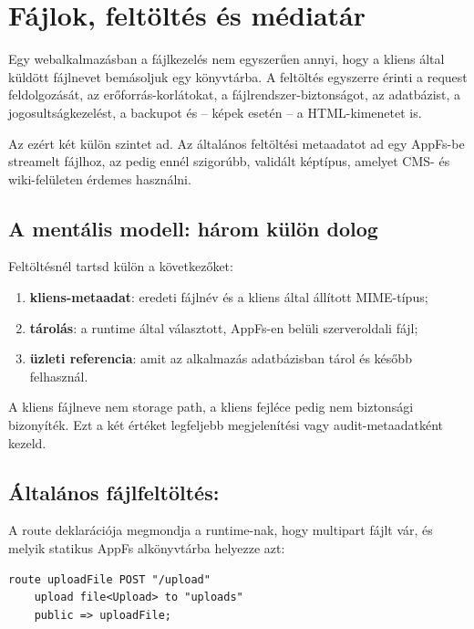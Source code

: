 \chapter{Fájlok, feltöltés és médiatár}

Egy webalkalmazásban a fájlkezelés nem egyszerűen annyi, hogy a kliens által küldött fájlnevet bemásoljuk egy könyvtárba. A feltöltés egyszerre érinti a request feldolgozását, az erőforrás-korlátokat, a fájlrendszer-biztonságot, az adatbázist, a jogosultságkezelést, a backupot és -- képek esetén -- a HTML-kimenetet is.

Az \rwlang{} ezért két külön szintet ad. Az általános  feltöltési metaadatot ad egy AppFs-be streamelt fájlhoz, az  pedig ennél szigorúbb, validált képtípus, amelyet CMS- és wiki-felületen érdemes használni.

\section{A mentális modell: három külön dolog}

Feltöltésnél tartsd külön a következőket:

\begin{enumerate}
  \item \textbf{kliens-metaadat}: eredeti fájlnév és a kliens által állított MIME-típus;
  \item \textbf{tárolás}: a runtime által választott, AppFs-en belüli szerveroldali fájl;
  \item \textbf{üzleti referencia}: amit az alkalmazás adatbázisban tárol és később felhasznál.
\end{enumerate}

A kliens fájlneve nem storage path, a kliens  fejléce pedig nem biztonsági bizonyíték. Ezt a két értéket legfeljebb megjelenítési vagy audit-metaadatként kezeld.

\section{Általános fájlfeltöltés: }

A route deklarációja megmondja a runtime-nak, hogy multipart fájlt vár, és melyik statikus AppFs alkönyvtárba helyezze azt:

\begin{lstlisting}[language=RWLang]
route uploadFile POST "/upload"
    upload file<Upload> to "uploads"
    public => uploadFile;
\end{lstlisting}

